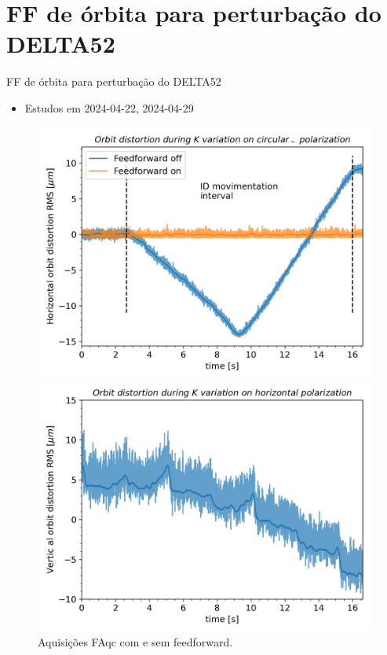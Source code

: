 \documentclass[aspectratio=169]{beamer}            %
\begin{document}
\section{FF de órbita para perturbação do DELTA52}

\begin{frame}{FF de órbita para perturbação do DELTA52}

\begin{itemize}
    \item Estudos em 2024-04-22, 2024-04-29
\end{itemize}

  \begin{figure}[ht]
        \begin{minipage}[b]{0.45\linewidth}
            \centering
            \includegraphics[width=\textwidth]{2024-05-10/figures/Orbit_dist_FAcq.png}
            \caption{Aquisições FAqc com e sem feedforward.}
            \label{fig:a}
        \end{minipage}
        \hspace{0.5cm}
        \begin{minipage}[b]{0.45\linewidth}
            \centering
            \includegraphics[width=\textwidth]{2024-05-10/figures/Orbit_dist_FAcq_bpm_disturb.png}

\end{minipage}
\end{figure}
\end{frame}
\end{document}
